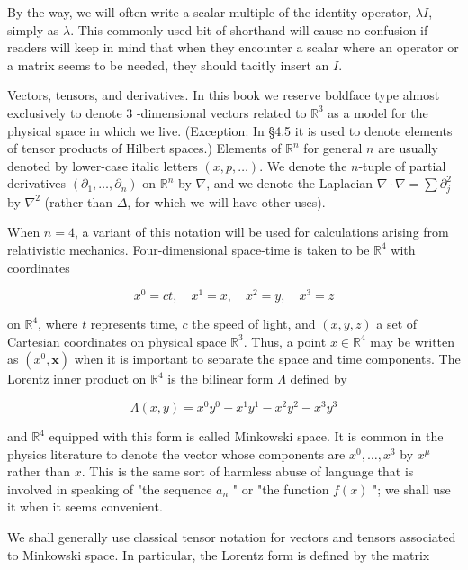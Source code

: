 \documentclass[10pt, letterpaper]{article}
\begin{document}
By the way, we will often write a scalar multiple of the identity operator, $\lambda I$, simply as $\lambda$. This commonly used bit of shorthand will cause no confusion if readers will keep in mind that when they encounter a scalar where an operator or a matrix seems to be needed, they should tacitly insert an $I$.

Vectors, tensors, and derivatives. In this book we reserve boldface type almost exclusively to denote 3 -dimensional vectors related to $\mathbb{R}^{3}$ as a model for the physical space in which we live. (Exception: In §4.5 it is used to denote elements of tensor products of Hilbert spaces.) Elements of $\mathbb{R}^{n}$ for general $n$ are usually denoted by lower-case italic letters $(x, p, \ldots)$. We denote the $n$-tuple of partial derivatives $\left(\partial_{1}, \ldots, \partial_{n}\right)$ on $\mathbb{R}^{n}$ by $\nabla$, and we denote the Laplacian $\nabla \cdot \nabla=\sum \partial_{j}^{2}$ by $\nabla^{2}$ (rather than $\Delta$, for which we will have other uses).

When $n=4$, a variant of this notation will be used for calculations arising from relativistic mechanics. Four-dimensional space-time is taken to be $\mathbb{R}^{4}$ with coordinates

$$
x^{0}=c t, \quad x^{1}=x, \quad x^{2}=y, \quad x^{3}=z
$$

on $\mathbb{R}^{4}$, where $t$ represents time, $c$ the speed of light, and $(x, y, z)$ a set of Cartesian coordinates on physical space $\mathbb{R}^{3}$. Thus, a point $x \in \mathbb{R}^{4}$ may be written as $\left(x^{0}, \mathbf{x}\right)$ when it is important to separate the space and time components. The Lorentz inner product on $\mathbb{R}^{4}$ is the bilinear form $\Lambda$ defined by

$$
\Lambda(x, y)=x^{0} y^{0}-x^{1} y^{1}-x^{2} y^{2}-x^{3} y^{3}
$$

and $\mathbb{R}^{4}$ equipped with this form is called Minkowski space. It is common in the physics literature to denote the vector whose components are $x^{0}, \ldots, x^{3}$ by $x^{\mu}$ rather than $x$. This is the same sort of harmless abuse of language that is involved in speaking of "the sequence $a_{n}$ " or "the function $f(x)$ "; we shall use it when it seems convenient.

We shall generally use classical tensor notation for vectors and tensors associated to Minkowski space. In particular, the Lorentz form is defined by the matrix
\end{document}
